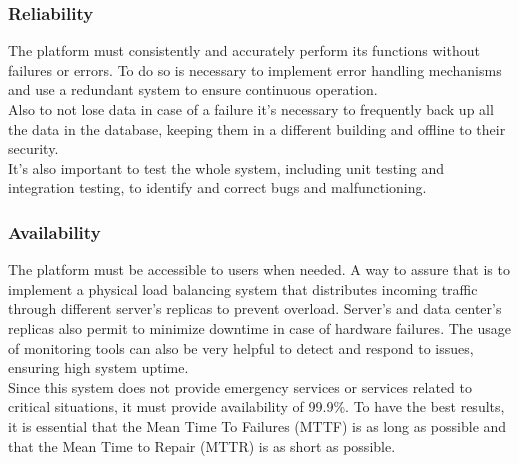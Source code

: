\subsubsection{Reliability}
The platform must consistently and accurately perform its functions without failures or errors. To do so is necessary to implement error handling mechanisms and use a redundant system to ensure continuous operation. \\
Also to not lose data in case of a failure it’s necessary to frequently back up all the data in the database, keeping them in a different building and offline to their security. \\
It’s also important to test the whole system, including unit testing and integration testing, to identify and correct bugs and malfunctioning.

\subsubsection{Availability}
The platform must be accessible to users when needed. A way to assure that is to implement a physical load balancing system that distributes incoming traffic through different server’s replicas to prevent overload. Server’s and data center’s replicas also permit to minimize downtime in case of hardware failures. The usage of monitoring tools can also be very helpful to detect and respond to issues, ensuring high system uptime. \\
Since this system does not provide emergency services or services related to critical situations, it must provide availability of 99.9\%. To have the best results, it is essential that the Mean Time To Failures (MTTF) is as long as possible and that the Mean Time to Repair (MTTR) is as short as possible.

